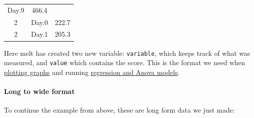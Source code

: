 \documentclass[]{article}
\newenvironment{Shaded}{\begin{snugshade}}{\end{snugshade}}
\newcommand{\KeywordTok}[1]{\textcolor[rgb]{0.13,0.29,0.53}{\textbf{#1}}}
\newcommand{\DataTypeTok}[1]{\textcolor[rgb]{0.13,0.29,0.53}{#1}}
\newcommand{\DecValTok}[1]{\textcolor[rgb]{0.00,0.00,0.81}{#1}}
\newcommand{\StringTok}[1]{\textcolor[rgb]{0.31,0.60,0.02}{#1}}
\newcommand{\OperatorTok}[1]{\textcolor[rgb]{0.81,0.36,0.00}{\textbf{#1}}}
\newcommand{\NormalTok}[1]{#1}
\let\oldparagraph\paragraph
\renewcommand{\paragraph}[1]{\oldparagraph{#1}\mbox{}}
\theoremstyle{definition}
\theoremstyle{definition}
\theoremstyle{definition}
\theoremstyle{remark}
\begin{document}
\begin{longtable}[]{@{}ccc@{}}
\begin{minipage}[t]{0.14\columnwidth}
Day.9\strut
\end{minipage} & \begin{minipage}[t]{0.09\columnwidth}\centering\strut
466.4\strut
\end{minipage}\tabularnewline
\begin{minipage}[t]{0.13\columnwidth}\centering\strut
2\strut
\end{minipage} & \begin{minipage}[t]{0.14\columnwidth}\centering\strut
Day.0\strut
\end{minipage} & \begin{minipage}[t]{0.09\columnwidth}\centering\strut
222.7\strut
\end{minipage}\tabularnewline
\begin{minipage}[t]{0.13\columnwidth}\centering\strut
2\strut
\end{minipage} & \begin{minipage}[t]{0.14\columnwidth}\centering\strut
Day.1\strut
\end{minipage} & \begin{minipage}[t]{0.09\columnwidth}\centering\strut
205.3\strut
\end{minipage}\tabularnewline
\bottomrule
\end{longtable}

Here melt has created two new variable: \texttt{variable}, which keeps
track of what was measured, and \texttt{value} which contains the score.
This is the format we need when \protect\hyperlink{graphics}{plotting
graphs} and running \protect\hyperlink{linear-models-simple}{regression
and Anova models}.

\paragraph{Long to wide format}\label{long-to-wide}

To continue the example from above, these are long form data we just
made:

\begin{Shaded}
\end{Shaded}
\end{document}

